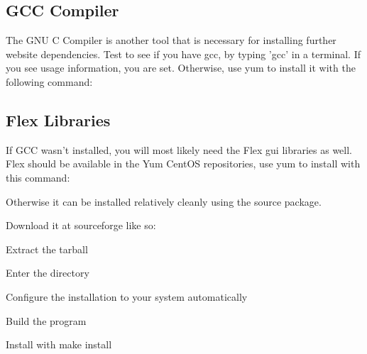 
\subsection{GCC Compiler}
The GNU C Compiler is another tool that is necessary for installing further website dependencies.  Test to see if you have gcc, by typing 'gcc' in a terminal.  If you see usage information, you are set.  Otherwise, use yum to install it with the following command:


\subsection{Flex Libraries}
If GCC wasn't installed, you will most likely need the Flex gui libraries as well.  Flex should be available in the Yum CentOS repositories, use yum to install with this command:


\vspace{1pc}

Otherwise it can be installed relatively cleanly using the source package.

Download it at sourceforge like so:


\vspace{1pc}

Extract the tarball


\vspace{1pc}

Enter the directory


\vspace{1pc}

Configure the installation to your system automatically


\vspace{1pc}

Build the program


\vspace{1pc}

Install with make install

